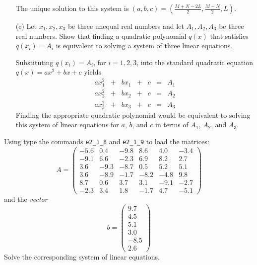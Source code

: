 \documentclass{ximera}
\begin{document}
\begin{exercise}
\begin{itemize}
\begin{hint}
\[\]
The unique solution to this system is $(a,b,c) =
(\frac{M + N - 2L}{2},\frac{M - N}{2},L)$.
\end{hint}
\item[(c)] Let $x_1,x_2,x_3$ be three unequal real
numbers and let $A_1,A_2,A_3$ be three real numbers.  Show
that finding a quadratic polynomial $q(x)$ that satisfies
$q(x_i) = A_i$ is equivalent to solving a system of three
linear equations.
\begin{hint}
   Substituting $q(x_i) = A_i$, for $i = 1,2,3$, into the standard
quadratic equation $q(x) = ax^2 + bx + c$ yields
\[
\begin{array}{ccccccc}
ax_1^2 & + & bx_1 & + & c & = & A_1 \\
ax_2^2 & + & bx_2 & + & c & = & A_2 \\
ax_3^2 & + & bx_3 & + & c & = & A_3\end{array}
\]
Finding the appropriate quadratic polynomial would be equivalent to
solving this system of linear equations for $a$, $b$, and $c$ in
terms of $A_1$, $A_2$, and $A_3$.
\end{hint}
\end{itemize}
\end{exercise}

\CEXER

\begin{exercise} \label{c2.1.1}
Using \Matlab type the commands {\tt e2\_1\_8} and {\tt e2\_1\_9}
to load the matrices:
\begin{equation*}
A = \left(
\begin{array}{rrrrrr}
   -5.6 &  0.4 & -9.8 &  8.6 &  4.0 & -3.4\\
   -9.1 &  6.6 & -2.3 &  6.9 &  8.2 &  2.7\\
    3.6 & -9.3 & -8.7 &  0.5 &  5.2 &  5.1\\
    3.6 & -8.9 & -1.7 & -8.2 & -4.8 &  9.8\\
    8.7 &  0.6 &  3.7 &  3.1 & -9.1 & -2.7\\
   -2.3 &  3.4 &  1.8 & -1.7 &  4.7 & -5.1
\end{array}
\right)
\end{equation*}
and the {\em vector\/}
\begin{equation*}
b = \left(
\begin{array}{r}
    9.7\\
    4.5\\
    5.1\\
    3.0\\
   -8.5\\
    2.6
\end{array}
\right)
\end{equation*}
Solve the corresponding system of linear equations.
\end{exercise}
\end{document}
